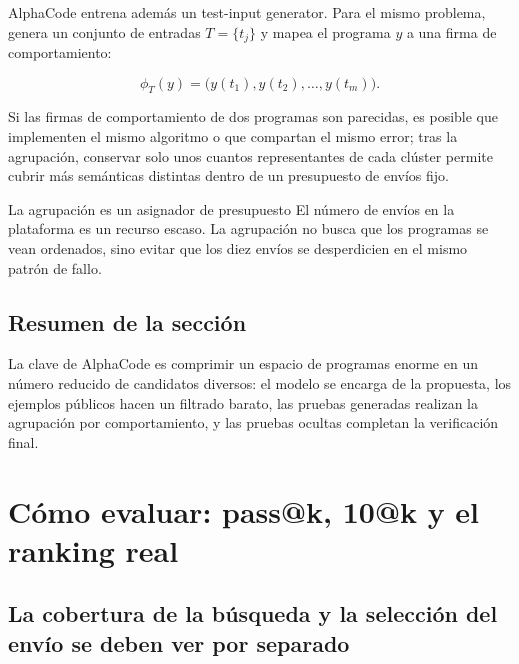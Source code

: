 \documentclass[a4paper]{article}
\begin{document}

AlphaCode entrena además un test-input generator. Para el mismo problema, genera un conjunto de entradas $T=\{t_j\}$ y mapea el programa $y$ a una firma de comportamiento:

$$
\phi_T(y)=\bigl(y(t_1),y(t_2),\ldots,y(t_m)\bigr).
$$

Si las firmas de comportamiento de dos programas son parecidas, es posible que implementen el mismo algoritmo o que compartan el mismo error; tras la agrupación, conservar solo unos cuantos representantes de cada clúster permite cubrir más semánticas distintas dentro de un presupuesto de envíos fijo.

\begin{knowledgebox}{La agrupación es un asignador de presupuesto}
El número de envíos en la plataforma es un recurso escaso. La agrupación no busca que los programas se vean ordenados, sino evitar que los diez envíos se desperdicien en el mismo patrón de fallo.
\end{knowledgebox}

\subsection{Resumen de la sección}

La clave de AlphaCode es comprimir un espacio de programas enorme en un número reducido de candidatos diversos: el modelo se encarga de la propuesta, los ejemplos públicos hacen un filtrado barato, las pruebas generadas realizan la agrupación por comportamiento, y las pruebas ocultas completan la verificación final.
\section{Cómo evaluar: pass@k, 10@k y el ranking real}

\subsection{La cobertura de la búsqueda y la selección del envío se deben ver por separado}

\end{document}
